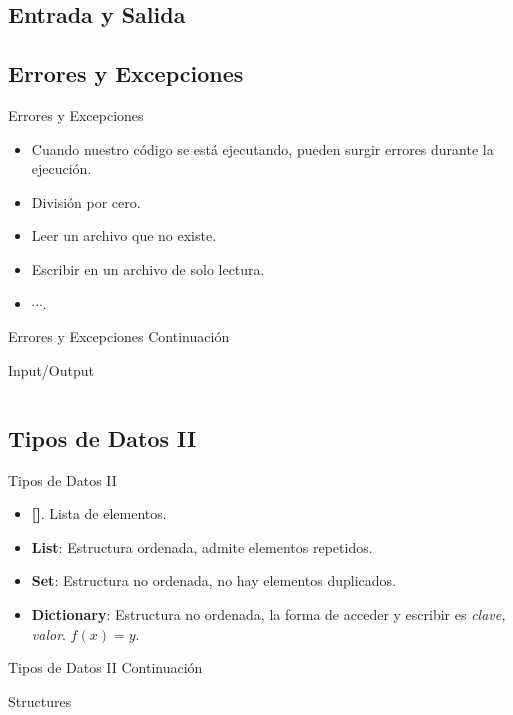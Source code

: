 \documentclass[usenames, dvipsnames, compress]{beamer}
\begin{document}
	\subsection{Entrada y Salida}
	
	\subsection{Errores y Excepciones}
		\begin{frame}{Errores y Excepciones}
		\begin{itemize}[<+- | alert@ +>]
			\item Cuando nuestro código se está ejecutando, pueden surgir errores durante la ejecución.
			\item División por cero.
			\item Leer un archivo que no existe.
			\item Escribir en un archivo de solo lectura.
			\item $\cdots$.
		\end{itemize}
		\end{frame}
		\begin{frame}{Errores y Excepciones Continuación}
		\begin{block}{Input/Output}
			\inputminted[xleftmargin=\parindent,linenos]{python}{codes/exceptions.py}
		\end{block}
		\end{frame}
		\subsection{Tipos de Datos II}
		\begin{frame}{Tipos de Datos II}
			\begin{itemize}[<+- | alert@ +>]
				\item \textbf{[]}. Lista de elementos.
				\item \textbf{List}: Estructura ordenada, admite elementos repetidos. 
				\item \textbf{Set}: Estructura no ordenada, no hay elementos duplicados.
				\item \textbf{Dictionary}: Estructura no ordenada, la forma de acceder y escribir es \textit{clave, valor}. $f(x) = y$.
			\end{itemize}
		\end{frame}
		\begin{frame}{Tipos de Datos II Continuación}
			\begin{block}{Structures}
				\inputminted[xleftmargin=\parindent,linenos]{python}{codes/structures.py}
			\end{block}
		\end{frame}
\end{document}
